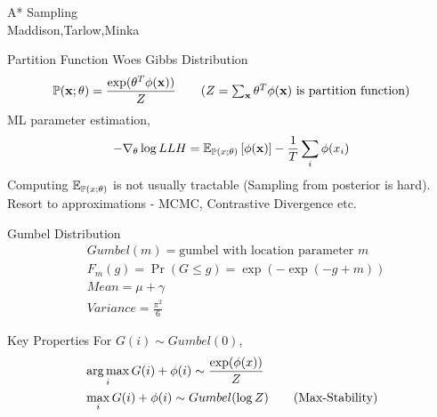 \begin{frame}
  \begin{center}
    {\huge A* Sampling
    } \\
    Maddison,Tarlow,Minka
  \end{center}
\end{frame}



\begin{frame}{Partition Function Woes}
  Gibbs Distribution
  \begin{align*}
    \Pr(\x;\theta) =\frac{\exp(\theta^T\phi(\x))}{Z} \tag{$Z=\sum_{\x} \theta^T\phi(\x)$ is partition function}
  \end{align*}
  ML parameter estimation,
  \begin{align*}
    - \nabla_\theta \log LLH = \operatorname{\mathbb{E}}_{\mathbb{P}(x;\theta)}\left[\phi(\operatorname{\mathbf{x}})\right] - \frac{1}{T} \sum_i\phi(x_i)
  \end{align*}
  Computing $\operatorname{\mathbb{E}}_{\mathbb{P}(x;\theta)}$ is not usually tractable (Sampling from posterior is hard).
  Resort to approximations - MCMC, Contrastive Divergence etc.
\end{frame}

\begin{frame}{Gumbel Distribution}
  \begin{align*}
    & Gumbel(m) = \text{gumbel with location parameter $m$}\\
    & F_m(g) = \Pr(G\le g) = \exp(-\exp(-g+m)) \tag{CDF for $Gumbel(m)$}\\
    & Mean = \mu+\gamma \tag{a fixed offset away from location parameter} \\
    & Variance = \frac{\pi^2}{6}
  \end{align*}
\end{frame}

\begin{frame}{Key Properties}
  For $G(i) \sim Gumbel(0)$,
  \begin{align*}
    & \operatorname*{{arg\,max}}_i{G(i)+\phi(i)} \sim \frac{\exp(\phi(x))}{Z} \\
    & \max_i{G(i)+\phi(i)} \sim Gumbel(\log Z) \tag{Max-Stability}
  \end{align*}
\end{frame}

